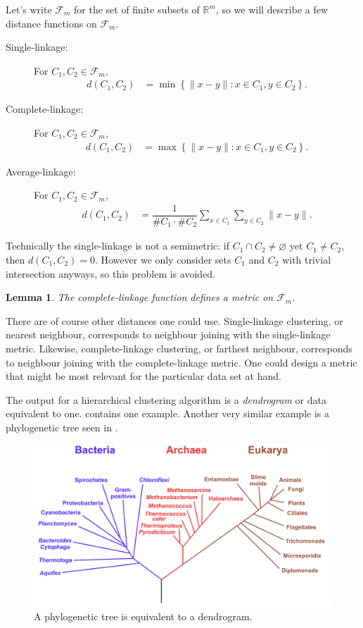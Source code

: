 \documentclass[a4paper, 12pt]{article}
\numberwithin{equation}{section}
\numberwithin{figure}{section}
\newtheorem{lem}[thm]{Lemma}
\theoremstyle{definition}
\newcommand{\R}{\mathbb{R}}
\begin{document}
Let's write $\mathscr{F}_m$ for the set of finite subsets of $\R^m$, so we will
describe a few distance functions on $\mathscr{F}_m$.
\begin{description}
	\item[Single-linkage:] For $C_1,C_2\in\mathscr{F}_m$, 
	\begin{align*}
		d(C_1, C_2) &= \min\left\{ \| x - y\| : x\in C_1, y\in C_2 \right\}. 
	\end{align*}
	\item[Complete-linkage:] For $C_1,C_2\in\mathscr{F}_m$, 
	\begin{align*}
		d(C_1, C_2) &= \max\left\{ \| x - y\| : x\in C_1, y\in C_2 \right\}. 
	\end{align*}
	\item[Average-linkage:] For $C_1,C_2\in\mathscr{F}_m$, 
	\begin{align*}
		d(C_1, C_2) &= \dfrac{1}{\# C_1 \cdot \# C_2} \sum_{x \in C_1} \sum_{y\in C_2} \|x - y\|. 
	\end{align*}
\end{description}
Technically the single-linkage is not a semimetric: if $C_1\cap C_2\neq
\varnothing$ yet $C_1\neq C_2$, then $d(C_1, C_2)=0$. However we only consider
sets $C_1$ and $C_2$ with trivial intersection anyways, so this problem is
avoided. 

\begin{lem}
	The complete-linkage function defines a metric on $\mathscr{F}_m$.
\end{lem}

There are of course other distances one could use. Single-linkage clustering, or
nearest neighbour, corresponds to neighbour joining with the single-linkage
metric. Likewise, complete-linkage clustering, or farthest neighbour,
corresponds to neighbour joining with the complete-linkage metric. One could
design a metric that might be most relevant for the particular data set at hand.

The output for a hierarchical clustering algorithm is a \emph{dendrogram} or
data equivalent to one.  contains one example.
Another very similar example is a phylogenetic tree seen in
.

\begin{figure}[h]
	\centering 
	\includegraphics[scale=0.3]{graphics/Phylogenetic_tree.png}
	\caption{A phylogenetic tree is equivalent to a dendrogram.}
	\label{fig:phylogenetic}
\end{figure}
\end{document}
